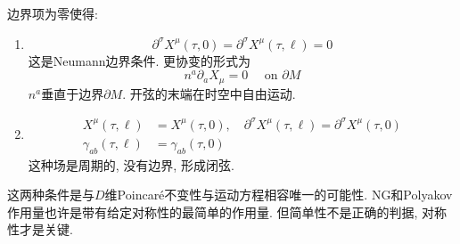 边界项为零使得:
\begin{enumerate}
    \item \begin{equation}
        \partial^{\sigma} X^{\mu}(\tau, 0)=\partial^{\sigma} X^{\mu}(\tau, \ell)=0 \label{Neumann-bound}
        \end{equation}
        这是Neumann边界条件. 更协变的形式为
        \begin{equation}
        n^{a} \partial_{a} X_{\mu}=0 \quad \text { on } \partial M
        \end{equation}
        $n^a$垂直于边界$\partial M$. 开弦的末端在时空中自由运动. 
     \item   
     \begin{subequations}
     \begin{align}
     X^{\mu}(\tau, \ell)&=X^{\mu}(\tau, 0), \quad \partial^{\sigma} X^{\mu}(\tau, \ell)=\partial^{\sigma} X^{\mu}(\tau, 0)\\
     \gamma_{a b}(\tau, \ell)&=\gamma_{a b}(\tau, 0)
     \end{align}
     \end{subequations}
     这种场是周期的, 没有边界, 形成闭弦. 
\end{enumerate}

这两种条件是与$D$维Poincar\'{e}不变性与运动方程相容唯一的可能性. NG和Polyakov作用量也许是带有给定对称性的最简单的作用量. 但简单性不是正确的判据, 对称性才是关键. 

